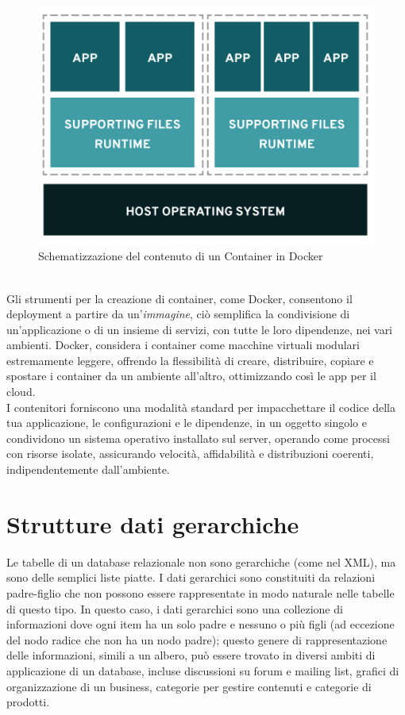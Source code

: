\begin{figure}[ht!]
	\centering
	\includegraphics[scale=0.7]{images/Docker_Config_Container.png}
	\caption{Schematizzazione del contenuto di un Container in Docker}
	\label{fig:DCC}
\end{figure}
\ \\
Gli strumenti per la creazione di container, come Docker, consentono il deployment a partire da un'\textit{immagine}, ciò semplifica la condivisione di 
un'applicazione o di un insieme di servizi, con tutte le loro dipendenze, nei vari ambienti.
Docker, considera i container come macchine virtuali modulari estremamente leggere, offrendo la flessibilità di creare, distribuire, 
copiare e spostare i container da un ambiente all'altro, ottimizzando così le app per il cloud.\\
I contenitori forniscono una modalità standard per impacchettare il codice della tua applicazione, le configurazioni e le dipendenze, in un oggetto singolo e 
condividono un sistema operativo installato sul server, operando come processi con risorse isolate, assicurando velocità, affidabilità e distribuzioni coerenti, 
indipendentemente dall’ambiente.

\section{Strutture dati gerarchiche}
Le tabelle di un database relazionale non sono gerarchiche (come nel XML), ma sono delle semplici liste piatte. I dati gerarchici sono 
constituiti da relazioni padre-figlio che non possono essere rappresentate in modo naturale nelle tabelle di questo tipo.
In questo caso, i dati gerarchici sono una collezione di informazioni dove ogni item ha un solo padre e nessuno o più figli
(ad eccezione del nodo radice che non ha un nodo padre); questo genere di rappresentazione delle informazioni, simili a un albero, 
può essere trovato in diversi ambiti di applicazione di un database, incluse discussioni su forum e mailing list, grafici di 
organizzazione di un business, categorie per gestire contenuti e categorie di prodotti.

